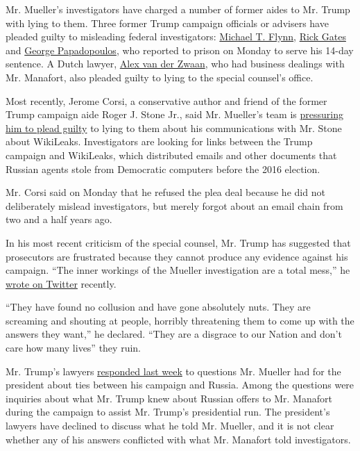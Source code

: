 Mr. Mueller's investigators have charged a number of former aides to Mr.
Trump with lying to them. Three former Trump campaign officials or
advisers have pleaded guilty to misleading federal investigators:
\href{https://www.nytimes.com/2017/12/01/us/politics/michael-flynn-guilty-russia-investigation.html}{Michael
T. Flynn},
\href{https://www.nytimes.com/2018/02/23/us/politics/rick-gates-guilty-plea-mueller-investigation.html}{Rick
Gates} and
\href{https://www.nytimes.com/2018/09/07/us/politics/george-papadopoulos-sentencing-special-counsel-investigation.html}{George
Papadopoulos}, who reported to prison on Monday to serve his 14-day
sentence. A Dutch lawyer,
\href{https://www.nytimes.com/2018/04/03/us/alex-van-der-zwaan-sentencing-russia-investigation-mueller.html}{Alex
van der Zwaan}, who had business dealings with Mr. Manafort, also
pleaded guilty to lying to the special counsel's office.

Most recently, Jerome Corsi, a conservative author and friend of the
former Trump campaign aide Roger J. Stone Jr., said Mr. Mueller's team
is
\href{https://www.nytimes.com/2018/11/23/us/politics/jerome-corsi-plea.html}{pressuring
him to plead guilty} to lying to them about his communications with Mr.
Stone about WikiLeaks. Investigators are looking for links between the
Trump campaign and WikiLeaks, which distributed emails and other
documents that Russian agents stole from Democratic computers before the
2016 election.

Mr. Corsi said on Monday that he refused the plea deal because he did
not deliberately mislead investigators, but merely forgot about an email
chain from two and a half years ago.

In his most recent criticism of the special counsel, Mr. Trump has
suggested that prosecutors are frustrated because they cannot produce
any evidence against his campaign. ``The inner workings of the Mueller
investigation are a total mess,'' he
\href{https://twitter.com/realdonaldtrump/status/1063042585802039296}{wrote
on Twitter} recently.

``They have found no collusion and have gone absolutely nuts. They are
screaming and shouting at people, horribly threatening them to come up
with the answers they want,'' he declared. ``They are a disgrace to our
Nation and don't care how many lives'' they ruin.

Mr. Trump's lawyers
\href{https://www.nytimes.com/2018/11/20/us/politics/trump-mueller-questions-answers.html}{responded
last week} to questions Mr. Mueller had for the president about ties
between his campaign and Russia. Among the questions were inquiries
about what Mr. Trump knew about Russian offers to Mr. Manafort during
the campaign to assist Mr. Trump's presidential run. The president's
lawyers have declined to discuss what he told Mr. Mueller, and it is not
clear whether any of his answers conflicted with what Mr. Manafort told
investigators.

